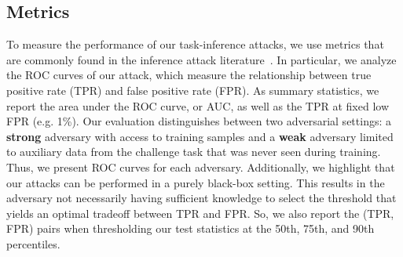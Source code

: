 



\subsection{Metrics}

To measure the performance of our task-inference attacks, we use metrics that are commonly found in the inference attack literature~\cite{carlini-2022-lira, zarifzadeh2024lowcostmia, ye-2022-enhanced_mi, kandpal2023userinference}. In particular, we analyze the ROC curves of our attack, which measure the relationship between true positive rate (TPR) and false positive rate (FPR). As summary statistics, we report the area under the ROC curve, or AUC, as well as the TPR at fixed low FPR (e.g. 1\%). Our evaluation distinguishes between two adversarial settings: a \textbf{strong} adversary with access to training samples and a \textbf{weak} adversary limited to auxiliary data from the challenge task that was never seen during training. Thus, we present ROC curves for each adversary. Additionally, we highlight that our attacks can be performed in a purely black-box setting. This results in the adversary not necessarily having sufficient knowledge to select the threshold that yields an optimal tradeoff between TPR and FPR. So, we also report the (TPR, FPR) pairs when thresholding our test statistics at the 50th, 75th, and 90th percentiles.




